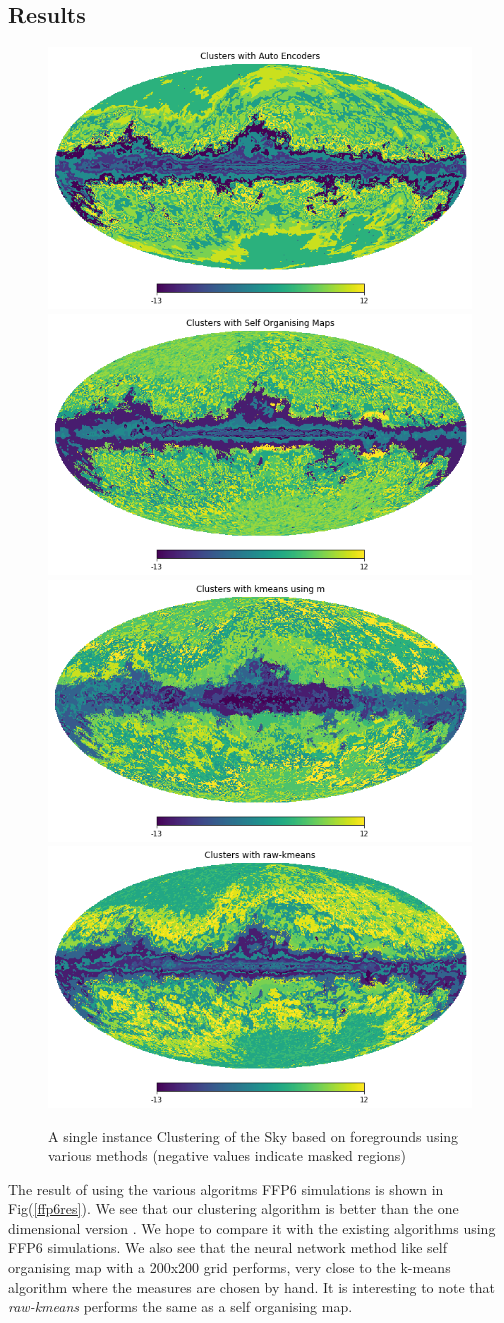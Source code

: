 \subsection{Results}
\begin{figure}[H]
  \centering
  \includegraphics[width=0.35\linewidth]{auto_clusters.png}
  \includegraphics[width=0.35\linewidth]{som_clusters.png}
  \includegraphics[width=0.35\linewidth]{kmeans_clusters.png}
  \includegraphics[width=0.35\linewidth]{raw_kmeans_clusters.png}
  \caption{A single instance Clustering of the Sky based on foregrounds using various methods (negative values indicate masked regions)}
\end{figure}
      The result of using the various algoritms FFP6 simulations is shown in Fig(\ref{ffp6res}).
We see that our clustering algorithm is better than the one dimensional version \cite{datarishi}.
We hope to compare it with the existing algorithms using FFP6 simulations. We also see that the
neural network method like self organising map with a 200x200 grid performs, very close to the
k-means algorithm where the measures are chosen by hand. It is interesting to note that
\emph{raw-kmeans} performs the same as a self organising map.
